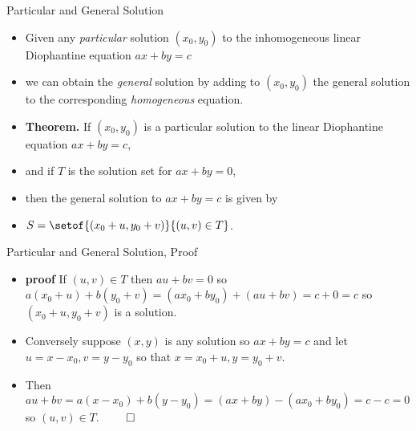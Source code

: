 \documentclass{beamer}
\begin{document}

\begin{frame}{Particular and General Solution}

\begin{itemize}
  \item Given any \emph{particular} solution $(x_0,y_0)$ to the inhomogeneous linear Diophantine equation $ax+by=c$
  \item we can obtain the \emph{general} solution by adding to $(x_0,y_0)$ the general solution to the
  corresponding \emph{homogeneous} equation.
  \item \textbf{Theorem.} If $(x_0, y_0)$ is a particular solution to the linear Diophantine
  equation $ax+by=c$,
  \item and if $T$ is the solution set for
  $ax + by = 0$,
  \item then the general solution to $ax+by=c$ is given by
  \item $S=\setof{(x_0 + u, y_0 + v)}{(u,v) \in T}$.
\end{itemize}

\end{frame}


\begin{frame}{Particular and General Solution, Proof}

\begin{itemize}
  \item \textbf{proof} If $(u,v)\in T$ then $au+bv = 0$ so $a(x_0 +u) + b(y_0 +v) = (ax_0 + by_0) + (au + bv)
  =c +0 =c$ so $(x_0+u, y_0+v)$ is a solution.
  \item Conversely suppose $(x,y)$ is any solution so $ax + by = c$ and let $u=x-x_0, v=y-y_0$ so that $x=x_0+u, y=y_0+v$.
  \item Then $au + bv = a(x-x_0) + b(y-y_0) = (ax + by) - (ax_0 + by_0) = c-c = 0$ so $(u,v)\in T$. $\qed$
\end{itemize}
\end{frame}

\end{document}
